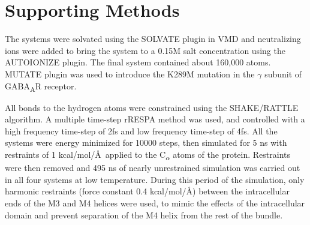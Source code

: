 \documentclass[9pt,onecolumn,oneside,lineno]{pnas-new}
\begin{document}
\newcommand{\grace}[1]{\textcolor{blue}{#1}}
\newcommand{\GABAA}{GABA\textsubscript{A}R\xspace}
\newcommand{\avgr}{\bar{r}}
\newcommand{\varr}{\delta r^{2}}
\newcommand{\plgics}{pLGICs}
\newcommand{\nachr}{nAChR}
\renewcommand{\thefigure}{S\arabic{figure}}
\newcommand{\WT}{WT\xspace}
\newcommand{\MT}{K289M\xspace}
\newcommand{\RMSD}{RMSD\textsubscript{symm}\xspace}
\newcommand{\WTs}{WT systems\xspace}
\newcommand{\MTs}{K289M systems\xspace}
\newcommand{\RMSDs}{RMSDs\textsubscript{symm}\xspace}
\setcounter{figure}{0}

\section*{Supporting Methods}

The systems were solvated using the SOLVATE plugin in VMD\cite{Humphrey1996a} and neutralizing ions were added to bring the system to a 0.15M salt concentration using the AUTOIONIZE plugin. The final system contained about 160,000 atoms. MUTATE plugin was used to introduce the K289M mutation in the $\gamma$ subunit of \GABAA receptor.

All bonds to the hydrogen atoms were constrained using the SHAKE/RATTLE algorithm. A multiple time-step rRESPA method was used, and controlled with a high frequency time-step of 2fs and low frequency time-step of 4fs. 
All the systems were energy minimized for 10000 steps, then simulated for 5 ns with restraints of 1 kcal/mol/\AA\ applied to the C\textsubscript{\(\alpha\)} atoms of the protein. Restraints were then removed and 495 ns of nearly unrestrained simulation was carried out in all four systems at low temperature. During this period of the simulation, only harmonic restraints (force constant 0.4 kcal/mol/\AA) between the intracellular ends of the M3 and M4 helices were used, to mimic the effects of the intracellular domain and prevent separation of the M4 helix from the rest of the bundle.
\end{document}
